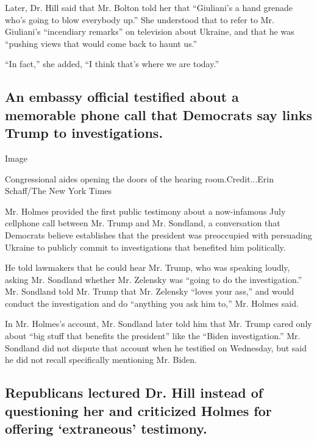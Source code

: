 Later, Dr. Hill said that Mr. Bolton told her that ``Giuliani's a hand
grenade who's going to blow everybody up.'' She understood that to refer
to Mr. Giuliani's ``incendiary remarks'' on television about Ukraine,
and that he was ``pushing views that would come back to haunt us.''

``In fact,'' she added, ``I think that's where we are today.''

\hypertarget{an-embassy-official-testified-about-a-memorable-phone-call-that-democrats-say-links-trump-to-investigations}{%
\subsection{An embassy official testified about a memorable phone call
that Democrats say links Trump to
investigations.}\label{an-embassy-official-testified-about-a-memorable-phone-call-that-democrats-say-links-trump-to-investigations}}

Image

Congressional aides opening the doors of the hearing room.Credit...Erin
Schaff/The New York Times

Mr. Holmes provided the first public testimony about a now-infamous July
cellphone call between Mr. Trump and Mr. Sondland, a conversation that
Democrats believe establishes that the president was preoccupied with
persuading Ukraine to publicly commit to investigations that benefited
him politically.

He told lawmakers that he could hear Mr. Trump, who was speaking loudly,
asking Mr. Sondland whether Mr. Zelensky was ``going to do the
investigation.'' Mr. Sondland told Mr. Trump that Mr. Zelensky ``loves
your ass,'' and would conduct the investigation and do ``anything you
ask him to,'' Mr. Holmes said.

In Mr. Holmes's account, Mr. Sondland later told him that Mr. Trump
cared only about ``big stuff that benefits the president'' like the
``Biden investigation.'' Mr. Sondland did not dispute that account when
he testified on Wednesday, but said he did not recall specifically
mentioning Mr. Biden.

\hypertarget{republicans-lectured-dr-hill-instead-of-questioning-her-and-criticized-holmes-for-offering-extraneous-testimony}{%
\subsection{Republicans lectured Dr. Hill instead of questioning her and
criticized Holmes for offering `extraneous'
testimony.}\label{republicans-lectured-dr-hill-instead-of-questioning-her-and-criticized-holmes-for-offering-extraneous-testimony}}

